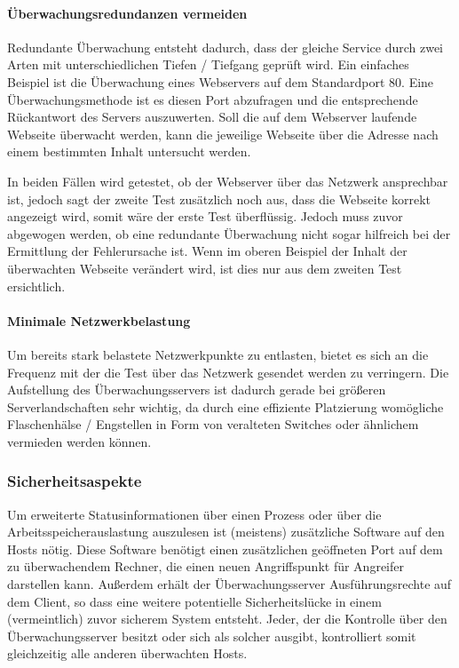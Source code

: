 \paragraph{Überwachungsredundanzen vermeiden}
Redundante Überwachung entsteht dadurch, dass der gleiche Service durch zwei Arten mit unterschiedlichen Tiefen / Tiefgang geprüft wird.
Ein einfaches Beispiel ist die Überwachung eines Webservers auf dem Standardport 80.
Eine Überwachungsmethode ist es diesen Port abzufragen und die entsprechende Rückantwort des Servers auszuwerten.
Soll die auf dem Webserver laufende Webseite überwacht werden, kann die jeweilige Webseite über die Adresse nach einem bestimmten Inhalt untersucht werden.

In beiden Fällen wird getestet, ob der Webserver über das Netzwerk ansprechbar ist, jedoch sagt der zweite Test zusätzlich noch aus, dass die Webseite korrekt angezeigt wird, somit wäre der erste Test überflüssig.
Jedoch muss zuvor abgewogen werden, ob eine redundante Überwachung nicht sogar hilfreich bei der Ermittlung der Fehlerursache ist.
Wenn im oberen Beispiel der Inhalt der überwachten Webseite verändert wird, ist dies nur aus dem zweiten Test ersichtlich.

\paragraph{Minimale Netzwerkbelastung}
Um bereits stark belastete Netzwerkpunkte zu entlasten, bietet es sich an die Frequenz mit der die Test über das Netzwerk gesendet werden zu verringern.
Die Aufstellung des Überwachungsservers ist dadurch gerade bei größeren Serverlandschaften sehr wichtig, da durch eine effiziente Platzierung womögliche Flaschenhälse / Engstellen in Form von veralteten Switches oder ähnlichem vermieden werden können.

\subsubsection{Sicherheitsaspekte}
Um erweiterte Statusinformationen über einen Prozess oder über die Arbeitsspeicherauslastung auszulesen ist (meistens) zusätzliche Software auf den Hosts nötig.
Diese Software benötigt einen zusätzlichen geöffneten Port auf dem zu überwachendem Rechner, die einen neuen Angriffspunkt für Angreifer darstellen kann.
Außerdem erhält der Überwachungsserver Ausführungsrechte auf dem Client, so dass eine weitere potentielle Sicherheitslücke in einem (vermeintlich) zuvor sicherem System entsteht.
Jeder, der die Kontrolle über den Überwachungsserver besitzt oder sich als solcher ausgibt, kontrolliert somit gleichzeitig alle anderen überwachten Hosts.

